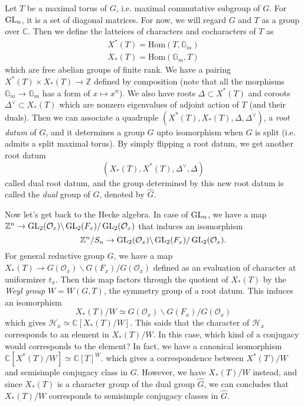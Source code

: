 Let $T$ be a maximal torus of $G$, i.e. maximal commutative subgroup of $G$.
For $\operatorname{\mathrm{GL}}_n$, it is a set of diagonal matrices.
For now, we will regard $G$ and $T$ as a group over $\mathbb{C}$.
Then we define the latteices of characters and cocharacters of $T$ as
\begin{align*}
X^{*}(T) = \mathrm{Hom}(T, \mathbb{G}_{m}) \\
X_{*}(T) = \mathrm{Hom}(\mathbb{G}_{m}, T)
\end{align*}
which are free abelian groups of finite rank.
We have a pairing $X^{*}(T)\times X_{*}(T) \to \mathbb{Z}$ defined by composition (note that all the morphisms $\mathbb{G}_{m} \to \mathbb{G}_{m}$
has a form of $x \mapsto x^{n}$).
We also have roots $\Delta \subset X^{*}(T)$ and coroots $\Delta ^{\vee} \subset X_{*}(T)$
which are nonzero eigenvalues of adjoint action of $T$ (and their duals).
Then we can associate a quadruple $(X^{*}(T), X_{*}(T), \Delta, \Delta^{\vee})$, a \emph{root datum} of $G$,
and it determines a group $G$ upto isomorphism when $G$ is split (i.e. admits a split maximal torus).
By simply flipping a root datum, we get another root datum
$$
(X_*(T), X^{*}(T), \Delta^{\vee}, \Delta)
$$
called dual root datum, and the group determined by this new root datum is called the \emph{dual} group of $G$, denoted by $\widehat{G}$.

Now let's get back to the Hecke algebra.
In case of $\operatorname{\mathrm{GL}}_{n}$, we have a map $\mathbb{Z}^{n} \to \operatorname{\mathrm{GL}}_2(\mathcal{O}_{x}) \backslash \operatorname{\mathrm{GL}}_2(F_{x}) / \operatorname{\mathrm{GL}}_2(\mathcal{O}_x)$ 
that induces an isomorphism 
$$
\mathbb{Z}^{n}/S_{n} \to \operatorname{\mathrm{GL}}_2(\mathcal{O}_x) \backslash \operatorname{\mathrm{GL}}_2(F_x) / \operatorname{\mathrm{GL}}_2(\mathcal{O}_x).
$$
For general reductive group $G$, we have a map $X_{*}(T) \to G(\mathcal{O}_x) \backslash G(F_x) / G(\mathcal{O}_x)$ defined as an evaluation of character at uniformizer $t_{x}$.
Then this map factors through the quotient of $X_{*}(T)$ by the \emph{Weyl group} $W = W(G, T)$, the symmetry group of a root datum.
This induces an isomorphism 
$$
X_{*}(T) / W \simeq G(\mathcal{O}_{x}) \backslash G(F_x) / G(\mathcal{O}_x)
$$
which gives $\mathcal{H}_{x} \simeq \mathbb{C}[X_{*}(T)/W]$.
This saids that the character of $\mathcal{H}_x$ corresponds to an element in $X_{*}(T)/W$.
In this case, which kind of a conjugacy would corresponds to the element?
In fact, we have a canonical isomorphism $\mathbb{C}[X^{*}(T)/W] \simeq \mathbb{C}[T]^{W}$.
which gives a correspondence between $X^{*}(T)/W$ and semisimple conjugacy class in $G$.
However, we have $X_{*}(T)/W$ instead, and since $X_{*}(T)$ is a character group of the dual group $\widehat{G}$, 
we can concludes that $X_{*}(T)/W$ corresponds to semisimple conjugacy classes in $\widehat{G}$.

